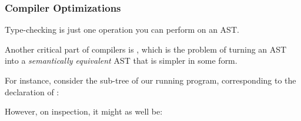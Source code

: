 \documentclass[aspectratio=169, handout]{beamer}
\begin{document}
\begin{frame}[fragile]
  \frametitle{Compiler Optimizations}

  \ptmt

  Type-checking is just one operation you can perform on an AST.

  \pause
  \vspace{\fill}

  Another critical part of compilers is ,
  which is the problem of turning an AST into a \textit{semantically equivalent}
  AST that is simpler in some form.

  \pause
  \vspace{\fill}

  \begin{center}
  \begin{minipage}[t]{0.45\textwidth}
    \raggedright

    For instance, consider the sub-tree of our running program, corresponding
    to the declaration of :
    \begin{center}
    \end{center}
  \end{minipage}
  \hspace{10pt}
  \begin{minipage}[t]{0.45\textwidth}
    \raggedright

    However, on inspection, it might as well be:

    \begin{center}
    \end{center}
  \end{minipage}
  \end{center}
\end{frame}
\end{document}
